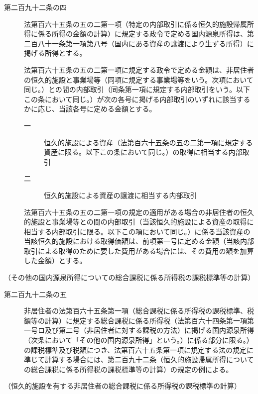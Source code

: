\documentclass[twocolumn,a4j,10pt]{ltjtarticle}
\begin{document}
\begin{description}
\item[第二百九十二条の四]法第百六十五条の五の二第一項（特定の内部取引に係る恒久的施設帰属所得に係る所得の金額の計算）に規定する政令で定める国内源泉所得は、第二百八十一条第一項第八号（国内にある資産の譲渡により生ずる所得）に掲げる所得とする。
\item[]法第百六十五条の五の二第一項に規定する政令で定める金額は、非居住者の恒久的施設と事業場等（同項に規定する事業場等をいう。次項において同じ。）との間の内部取引（同条第一項に規定する内部取引をいう。以下この条において同じ。）が次の各号に掲げる内部取引のいずれに該当するかに応じ、当該各号に定める金額とする。
\begin{description}
\item[一]恒久的施設による資産（法第百六十五条の五の二第一項に規定する資産に限る。以下この条において同じ。）の取得に相当する内部取引
\item[二]恒久的施設による資産の譲渡に相当する内部取引
\end{description}
\item[]法第百六十五条の五の二第一項の規定の適用がある場合の非居住者の恒久的施設と事業場等との間の内部取引（当該恒久的施設による資産の取得に相当する内部取引に限る。以下この項において同じ。）に係る当該資産の当該恒久的施設における取得価額は、前項第一号に定める金額（当該内部取引による取得のために要した費用がある場合には、その費用の額を加算した金額）とする。
\end{description}
\noindent\hspace{10pt}（その他の国内源泉所得についての総合課税に係る所得税の課税標準等の計算）
\begin{description}
\item[第二百九十二条の五]非居住者の法第百六十五条第一項（総合課税に係る所得税の課税標準、税額等の計算）に規定する総合課税に係る所得税（法第百六十四条第一項第一号ロ及び第二号（非居住者に対する課税の方法）に掲げる国内源泉所得（次条において「その他の国内源泉所得」という。）に係る部分に限る。）の課税標準及び税額につき、法第百六十五条第一項に規定する法の規定に準じて計算する場合には、第二百九十二条（恒久的施設帰属所得についての総合課税に係る所得税の課税標準等の計算）の規定の例による。
\end{description}
\noindent\hspace{10pt}（恒久的施設を有する非居住者の総合課税に係る所得税の課税標準の計算）
\end{document}
